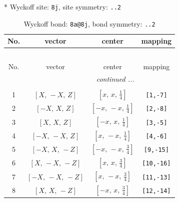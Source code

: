 \documentclass[fleqn,8pt]{jsarticle}
\begin{document}
* Wyckoff site: {\tt 8j}, site symmetry: {\tt ..2}
\renewcommand{\arraystretch}{1.2}
\begin{longtable}{cccc}
\caption{Wyckoff bond: {\tt 8a@8j}, bond symmetry: {\tt ..2}}
 \\
 \hline \hline
No. & vector & center & mapping \\ \hline \endfirsthead

\multicolumn{3}{l}{\tablename\ \thetable{}} \\
 \hline \hline
No. & vector & center & mapping \\ \hline \endhead

 \hline \hline
\multicolumn{3}{r}{\footnotesize\it continued ...} \\ \endfoot

 \hline \hline
\multicolumn{3}{r}{} \\ \endlastfoot

1 & $\left[ X,\, - X,\, Z \right]$ & $\left[ x,\, x,\, \frac{1}{4} \right]$ & {\tt [1,-7]} \\ \hline
2 & $\left[ - X,\, X,\, Z \right]$ & $\left[ - x,\, - x,\, \frac{1}{4} \right]$ & {\tt [2,-8]} \\ \hline
3 & $\left[ X,\, X,\, Z \right]$ & $\left[ - x,\, x,\, \frac{1}{4} \right]$ & {\tt [3,-5]} \\ \hline
4 & $\left[ - X,\, - X,\, Z \right]$ & $\left[ x,\, - x,\, \frac{1}{4} \right]$ & {\tt [4,-6]} \\ \hline
5 & $\left[ - X,\, X,\, - Z \right]$ & $\left[ - x,\, - x,\, \frac{3}{4} \right]$ & {\tt [9,-15]} \\ \hline
6 & $\left[ X,\, - X,\, - Z \right]$ & $\left[ x,\, x,\, \frac{3}{4} \right]$ & {\tt [10,-16]} \\ \hline
7 & $\left[ - X,\, - X,\, - Z \right]$ & $\left[ x,\, - x,\, \frac{3}{4} \right]$ & {\tt [11,-13]} \\ \hline
8 & $\left[ X,\, X,\, - Z \right]$ & $\left[ - x,\, x,\, \frac{3}{4} \right]$ & {\tt [12,-14]} \\
\end{longtable}
\renewcommand{\arraystretch}{1.2}
\end{document}
